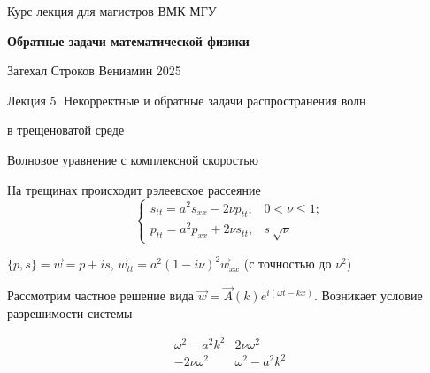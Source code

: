 \documentclass{article}
\begin{document}
\centerline{\large Курс лекция для магистров ВМК МГУ}
\centerline {\textbf{\LARGE Обратные задачи математической физики}}
\centerline {Затехал Строков Вениамин 2025}

\vspace{0.4cm}

\centerline{\LARGE 	Лекция 5. Некорректные и обратные задачи распространения волн}
\centerline{\LARGE 	в трещеноватой среде}

\vspace{0.5cm}

\centerline{\large Волновое уравнение с комплексной скоростью}

На трещинах происходит рэлеевское рассеяние
\[
\begin{cases}
s_{tt} = a^2 s_{xx} - 2 \nu p_{tt}, & 0 < \nu \leqslant 1;\\
p_{tt} = a^2 p_{xx} + 2 \nu s_{tt}, & s ~ \sqrt{\nu}
\end{cases}
\]

$\{p,s\} = \overrightarrow{w} = p + i s$, $ \overrightarrow{w}_{tt} = a^2(1- i\nu)^2 \overrightarrow{w}_{xx}$ (с точностью до $\nu^2$)

Рассмотрим частное решение вида 
$\overrightarrow{w} = \overrightarrow{A}(k) e^{i(\omega t - k x)}$. 
Возникает условие разрешимости системы

$$
\begin{matrix}
\omega^2 - a^2 k^2  	&  2 \nu \omega^2 \\
- 2 \nu \omega^2		&  \omega^2 - a^2 k^2
\end{matrix}
$$
\end{document}
